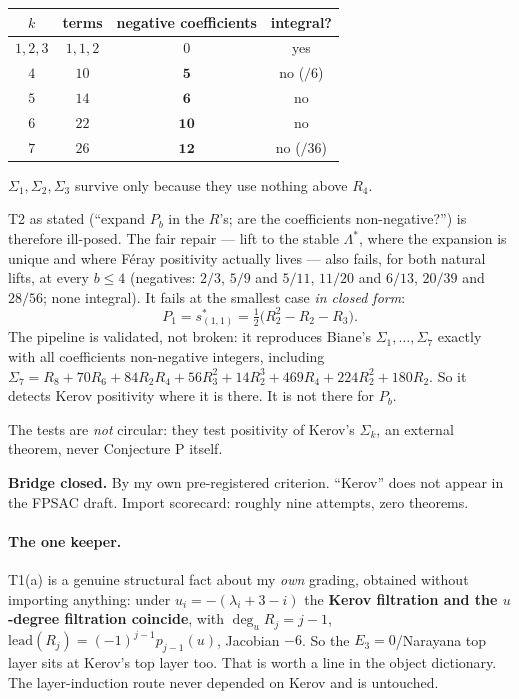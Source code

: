 \documentclass[11pt,a4paper]{article}
\theoremstyle{plain}
\theoremstyle{definition}
\begin{document}
\begin{center}
\begin{tabular}{@{}c|c|c|c@{}}
\toprule
$k$ & terms & \textbf{negative} coefficients & integral?\\
\midrule
$1,2,3$ & $1,1,2$ & $0$ & yes\\
$4$ & $10$ & $\mathbf 5$ & no ($/6$)\\
$5$ & $14$ & $\mathbf 6$ & no\\
$6$ & $22$ & $\mathbf{10}$ & no\\
$7$ & $26$ & $\mathbf{12}$ & no ($/36$)\\
\bottomrule
\end{tabular}
\end{center}

\noindent $\Sigma_1,\Sigma_2,\Sigma_3$ survive only because they use nothing above $R_4$.

T2 as stated (``expand $P_b$ in the $R$'s; are the coefficients non-negative?'') is therefore
ill-posed. The fair repair --- lift to the stable $\Lambda^*$, where the expansion is unique
and where F\'eray positivity actually lives --- also fails, for both natural lifts, at every
$b\le4$ (negatives: $2/3$, $5/9$ and $5/11$, $11/20$ and $6/13$, $20/39$ and $28/56$; none
integral). It fails at the smallest case \emph{in closed form}:
\[
P_1=s^*_{(1,1)}=\tfrac12\bigl(R_2^2-R_2-R_3\bigr).
\]
The pipeline is validated, not broken: it reproduces Biane's $\Sigma_1,\dots,\Sigma_7$
exactly with all coefficients non-negative integers, including
$\Sigma_7=R_8+70R_6+84R_2R_4+56R_3^2+14R_2^3+469R_4+224R_2^2+180R_2$. So it detects Kerov
positivity where it is there. It is not there for $P_b$.

The tests are \emph{not} circular: they test positivity of Kerov's $\Sigma_k$, an external
theorem, never Conjecture P itself.

\medskip
\noindent\textbf{Bridge closed.} By my own pre-registered criterion. ``Kerov'' does not
appear in the FPSAC draft. Import scorecard: roughly nine attempts, zero theorems.

\paragraph{The one keeper.} T1(a) is a genuine structural fact about my \emph{own} grading,
obtained without importing anything: under $u_i=-(\lambda_i+3-i)$ the \textbf{Kerov
filtration and the $u$-degree filtration coincide}, with $\deg_uR_j=j-1$,
$\mathrm{lead}(R_j)=(-1)^{j-1}p_{j-1}(u)$, Jacobian $-6$. So the $E_3=0$/Narayana top layer
sits at Kerov's top layer too. That is worth a line in the object dictionary. The
layer-induction route never depended on Kerov and is untouched.
\end{document}

